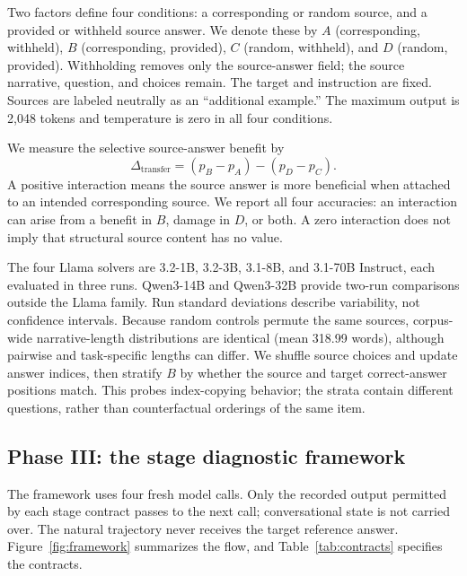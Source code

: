 Two factors define four conditions: a corresponding or random source, and a provided or withheld source answer. We denote these by $A$ (corresponding, withheld), $B$ (corresponding, provided), $C$ (random, withheld), and $D$ (random, provided). Withholding removes only the source-answer field; the source narrative, question, and choices remain. The target and instruction are fixed. Sources are labeled neutrally as an ``additional example.'' The maximum output is 2,048 tokens and temperature is zero in all four conditions.

We measure the selective source-answer benefit by
\begin{equation}
 \Delta_{\mathrm{transfer}}=(p_B-p_A)-(p_D-p_C).
 \label{eq:interaction}
\end{equation}
A positive interaction means the source answer is more beneficial when attached to an intended corresponding source. We report all four accuracies: an interaction can arise from a benefit in $B$, damage in $D$, or both. A zero interaction does not imply that structural source content has no value.

The four Llama solvers are 3.2-1B, 3.2-3B, 3.1-8B, and 3.1-70B Instruct, each evaluated in three runs. Qwen3-14B and Qwen3-32B provide two-run comparisons outside the Llama family. Run standard deviations describe variability, not confidence intervals. Because random controls permute the same sources, corpus-wide narrative-length distributions are identical (mean 318.99 words), although pairwise and task-specific lengths can differ. We shuffle source choices and update answer indices, then stratify $B$ by whether the source and target correct-answer positions match. This probes index-copying behavior; the strata contain different questions, rather than counterfactual orderings of the same item.

\subsection{Phase III: the stage diagnostic framework}
\label{sec:framework}
The framework uses four fresh model calls. Only the recorded output permitted by each stage contract passes to the next call; conversational state is not carried over. The natural trajectory never receives the target reference answer. Figure~\ref{fig:framework} summarizes the flow, and Table~\ref{tab:contracts} specifies the contracts.

